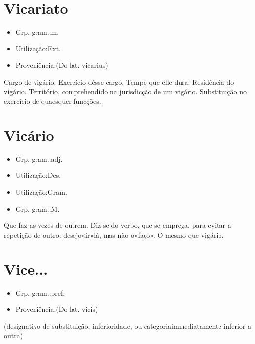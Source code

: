 \documentclass{article}
\begin{document}
\section{Vicariato}
\begin{itemize}
\item {Grp. gram.:m.}
\end{itemize}
\begin{itemize}
\item {Utilização:Ext.}
\end{itemize}
\begin{itemize}
\item {Proveniência:(Do lat. \textunderscore vicarius\textunderscore )}
\end{itemize}
Cargo de vigário.
Exercício dêsse cargo.
Tempo que elle dura.
Residência do vigário.
Território, comprehendido na jurisdicção de um vigário.
Substituição no exercício de quaesquer funcções.
\section{Vicário}
\begin{itemize}
\item {Grp. gram.:adj.}
\end{itemize}
\begin{itemize}
\item {Utilização:Des.}
\end{itemize}
\begin{itemize}
\item {Utilização:Gram.}
\end{itemize}
\begin{itemize}
\item {Grp. gram.:M.}
\end{itemize}
Que faz as vezes de outrem.
Diz-se do verbo, que se emprega, para evitar a repetição de outro: \textunderscore desejo«ir»lá, mas não o«faço»\textunderscore .
O mesmo que \textunderscore vigário\textunderscore .
\section{Vice...}
\begin{itemize}
\item {Grp. gram.:pref.}
\end{itemize}
\begin{itemize}
\item {Proveniência:(Do lat. \textunderscore vicis\textunderscore )}
\end{itemize}
(designativo de \textunderscore substituição\textunderscore , \textunderscore inferioridade\textunderscore , ou \textunderscore categoria\textunderscore  immediatamente inferior a outra)
\end{document}
